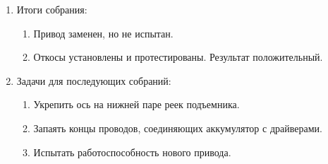 \begin{enumerate}
\begin{enumerate}
	\end{enumerate}
	
	\item Итоги собрания:
	\begin{enumerate}
		
		\item Привод заменен, но не испытан.
		
		\item Откосы установлены и протестированы. Результат положительный.
		
	\end{enumerate}
	
	\item Задачи для последующих собраний:
	\begin{enumerate}
		
		\item Укрепить ось на нижней паре реек подъемника.
		
		\item Запаять концы проводов, соединяющих аккумулятор с драйверами.
		
		\item Испытать работоспособность нового привода.
		
	\end{enumerate}
\end{enumerate}
\fillpage
